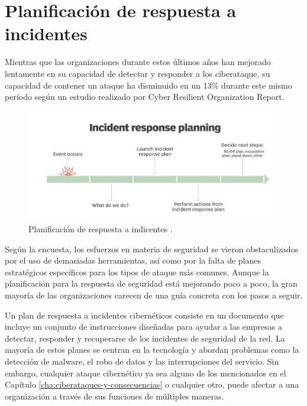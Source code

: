 \chapter{Planificación de respuesta a incidentes}
\label{cha:planificacion-de-respuesta}

Mientras que las organizaciones durante estos últimos años han mejorado lentamente en su capacidad 
de detectar y responder a los ciberataque, su capacidad de contener un ataque ha disminuido en un 
13\% durante este mismo período según un estudio realizado por Cyber Resilient Organization Report.\cite{ibm-article}

\begin{figure}[H]
  		   \centering
     		   \includegraphics[width=6in]{planif-respuesta.png}
  		   \caption{Planificación de respuesta a indicentes \cite{plan-respuesta}.}
  		   \label{img:planif-respuesta}
\end{figure}

Según la encuesta, los esfuerzos en materia de seguridad se vieron obstaculizados por el uso de 
demasiadas herramientas, así como por la falta de planes estratégicos específicos para los tipos de 
ataque más comunes. Aunque la planificación para la respuesta de seguridad está mejorando poco a 
poco, la gran mayoría de las organizaciones carecen de una guía concreta con los pasos a seguir.

Un plan de respuesta a incidentes cibernéticos consiste en un documento que incluye un conjunto 
de instrucciones diseñadas para ayudar a las empresas a detectar, responder y recuperarse de los 
incidentes de seguridad de la red. La mayoría de estos planes se centran en la tecnología y abordan 
problemas como la detección de malware, el robo de datos y las interrupciones del servicio. Sin 
embargo, cualquier ataque cibernético ya sea alguno de los mencionados en el Capítulo 
\ref{cha:ciberataques-y-consecuencias} o cualquier otro, puede afectar a una organización a través 
de sus funciones de múltiples maneras.

